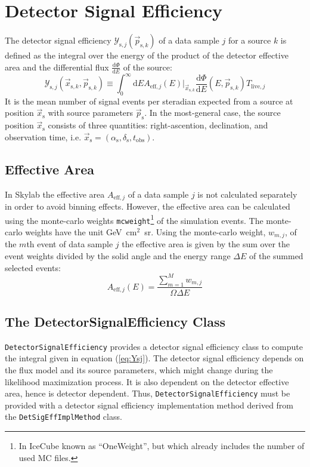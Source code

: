 \documentclass{article}
\newcommand{\eq}[1]{(\ref{#1})}
\newcommand{\code}[1]{\texttt{#1}}
\newcommand{\class}[1]{\colorbox{blue!30}{\code{#1}}}
\newcommand{\ps}{\vec{p}_{\mathrm{s}}}
\newcommand{\psk}{\vec{p}_{\mathrm{s},k}}
\newcommand{\xs}{\vec{x}_{\mathrm{s}}}
\newcommand{\xsk}{\vec{x}_{\mathrm{s},k}}
\begin{document}
\section{Detector Signal Efficiency}

The detector signal efficiency $\mathcal{Y}_{\mathrm{s},j}(\psk)$
of a data sample $j$ for a source $k$ is defined as the integral over the energy
of the product of the detector effective area and the differential flux
$\frac{\mathrm{d}\Phi}{\mathrm{d}E}$ of the source:
\begin{equation}
 \mathcal{Y}_{\mathrm{s},j}(\xsk,\psk) \equiv \int_0^\infty \mathrm{d}E A_{\mathrm{eff},j}(E)|_{\xsk} \frac{\mathrm{d}\Phi}{\mathrm{d}E}(E,\psk) T_{\mathrm{live},j}
\label{eq:Ysj}
\end{equation}
It is the mean number of signal events per steradian expected from a source at
position $\xs$ with source parameters $\ps$. In the most-general case,
the source position $\xs$ consists of three quantities: right-ascention,
declination, and observation time, i.e.
$\xs = (\alpha_{\mathrm{s}},\delta_{\mathrm{s}},t_{\mathrm{obs}})$.

\subsection{Effective Area}

In Skylab the effective area $A_{\mathrm{eff},j}$ of a data sample $j$ is not
calculated separately in order to avoid binning effects. However, the effective
area can be calculated using the monte-carlo weights \code{mcweight}\footnote{In IceCube
known as ``OneWeight'', but which already includes the number of used MC files.}
of the simulation events.
The monte-carlo weights have the unit GeV~cm$^2$~sr.
Using the monte-carlo weight, $w_{m,j}$, of the $m$th event of data sample $j$
the effective area is given by the sum over the event weights divided by the
solid angle and the energy range $\Delta E$ of the summed selected events:
\begin{equation}
 A_{\mathrm{eff},j}(E) = \frac{\sum_{m=1}^{M} w_{m,j}}{\Omega \Delta E}
\end{equation}


\subsection{The DetectorSignalEfficiency Class}

\class{DetectorSignalEfficiency} provides a detector signal efficiency class to
compute the integral given in equation \eq{eq:Ysj}. The detector signal
efficiency depends on the flux model and its source parameters, which might
change during the likelihood maximization process. It is also dependent on the
detector effective area, hence is detector dependent. Thus,
\class{DetectorSignalEfficiency} must be provided with a detector signal
efficiency implementation method derived from the \class{DetSigEffImplMethod}
class.
\end{document}
